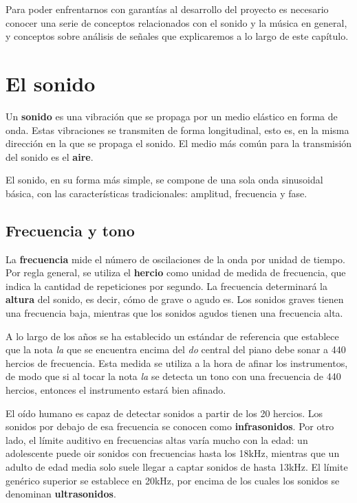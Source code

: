Para poder enfrentarnos con garantías al desarrollo del proyecto es
necesario conocer una serie de conceptos relacionados con el sonido y
la música en general, y conceptos sobre análisis de señales que
explicaremos a lo largo de este capítulo.

\section{El sonido}
Un \textbf{sonido} es una vibración que se propaga por un medio
elástico en forma de onda. Estas vibraciones se transmiten de forma
longitudinal, esto es, en la misma dirección en la que se propaga el
sonido. El medio más común para la transmisión del sonido es el
\textbf{aire}. 

El sonido, en su forma más simple, se compone de una sola onda
sinusoidal básica, con las características tradicionales: amplitud,
frecuencia y fase.

\subsection{Frecuencia y tono}
La \textbf{frecuencia} mide el número de oscilaciones de la onda por
unidad de tiempo. Por regla general, se utiliza el \textbf{hercio}
como unidad de medida de frecuencia, que indica la cantidad de
repeticiones por segundo. La frecuencia determinará la \textbf{altura}
del sonido, es decir, cómo de grave o agudo es. Los sonidos graves
tienen una frecuencia baja, mientras que los sonidos agudos tienen una
frecuencia alta.

A lo largo de los años se ha establecido un estándar de referencia que
establece que la nota \textit{la} que se encuentra encima del
\textit{do} central del piano debe sonar a 440 hercios de
frecuencia. Esta medida se utiliza a la hora de afinar los
instrumentos, de modo que si al tocar la nota \textit{la} se detecta
un tono con una frecuencia de 440 hercios, entonces el instrumento
estará bien afinado.

El oído humano es capaz de detectar sonidos a partir de los 20
hercios. Los sonidos por debajo de esa frecuencia se conocen como
\textbf{infrasonidos}. Por otro lado, el límite auditivo en
frecuencias altas varía mucho con la edad: un adolescente puede oir
sonidos con frecuencias hasta los 18kHz, mientras que un adulto de
edad media solo suele llegar a captar sonidos de hasta 13kHz. El
límite genérico superior se establece en 20kHz, por encima de los
cuales los sonidos se denominan \textbf{ultrasonidos}.

